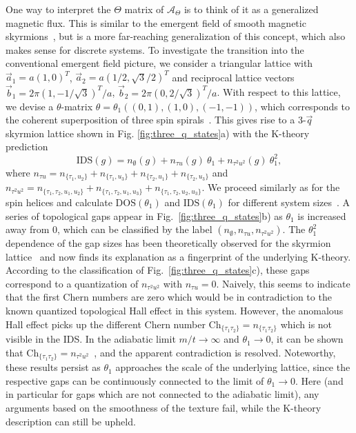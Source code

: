 \documentclass[
    10pt,
    aps,
    prl,
    twocolumn,
    floatfix,
    superscriptaddress
]{revtex4-2}
\newcommand{\SupplementalMaterial}{\cite{Note1}}
\begin{document}

One way to interpret the $\Theta$ matrix of $\mathcal{A}_\Theta$ is to think of it as a generalized magnetic flux.
This is similar to the emergent field of smooth magnetic skyrmions~\cite{Bliokh2005, Schulz2012}, but is a more far-reaching generalization of this concept, which also makes sense for discrete systems.
To investigate the transition into the conventional emergent field picture, we consider a triangular lattice with $\vec{a}_1 = a (1,0)^T$, $\vec{a}_2 = a (1/2,\sqrt{3}/2 )^T$ and reciprocal lattice vectors
$\vec{b}_1 = 2 \pi (1, -1/\sqrt{3})^T / a$, $	\vec{b}_2 = 2 \pi (0, 2 / \sqrt{3})^T / a$.
With respect to this lattice, we devise a $\theta$-matrix
$ \theta = \theta_1 (( 
	0, 1),
	(  1,0 ),
	( -1,-1 )) $,
which corresponds to the coherent superposition of three spin spirals~\SupplementalMaterial. 
This gives rise to a 3-$\vec{q}$ skyrmion lattice shown in Fig. \ref{fig:three_q_states}a) with the K-theory prediction
\begin{equation}
     \mathrm{IDS}(g) = n_\emptyset(g) + n_{\tau u}(g)~\theta_1 + n_{\tau^2u^2}(g)~\theta_1^2,
    \label{eq:k_prediction_skx}
\end{equation}
where $n_{\tau u} = n_{ \lbrace \tau_1 , u_2\rbrace} + n_{\lbrace\tau_1 , u_3\rbrace}+n_{\lbrace\tau_2 , u_1\rbrace}+n_{\lbrace\tau_2 , u_3\rbrace}$ and $n_{\tau^2u^2} = n_{\lbrace\tau_1, \tau_2 , u_1 , u_2\rbrace} +  n_{\lbrace\tau_1 , \tau_2 ,  u_1 ,  u_3\rbrace} + n_{\lbrace\tau_1 , \tau_2 ,  u_2  , u_3 \rbrace}$.
We proceed similarly as for the spin helices and calculate $\mathrm{DOS}(\theta_1)$ and $\mathrm{IDS}(\theta_1)$ for different system sizes~\SupplementalMaterial.
A series of topological gaps appear in Fig.~\ref{fig:three_q_states}b) as $\theta_1$ is increased away from $0$, which can be classified by the label $(n_\emptyset, n_{\tau u}, n_{\tau^2u^2})$.
The $\theta_1^2$ dependence of the gap sizes  has been theoretically observed for the skyrmion lattice~\cite{Hamamoto2015} and now finds its explanation as a fingerprint of the underlying K-theory.
According to the classification of Fig.~\ref{fig:three_q_states}c), 
these gaps correspond to a quantization of $n_{\tau^2u^2}$ with $n_{\tau u}=0$.
Naively, this seems to indicate that the first Chern numbers are zero which would be in contradiction to the known quantized topological Hall effect in this system.
However, the anomalous Hall effect picks up the different Chern number $\mathrm{Ch}_{ \lbrace \tau_1 \tau_2 \rbrace } = n_{ \lbrace \tau_1 \tau_2 \rbrace }$ \cite{Prodan2017} which is not visible in the IDS.
In the adiabatic limit $m/t \to \infty$ and $\theta_1 \to 0$, it can be shown that $\mathrm{Ch}_{ \lbrace \tau_1 \tau_2 \rbrace } = n_{\tau^2u^2}$~\SupplementalMaterial, and the apparent contradiction is resolved.
Noteworthy, these results persist as $\theta_1$ approaches the scale of the underlying lattice, since the respective gaps can be continuously connected to the limit of $\theta_1 \to 0$.
Here (and in particular for gaps which are not connected to the adiabatic limit), any arguments based on the smoothness of the texture fail, while the K-theory description can still be upheld.
\end{document}
